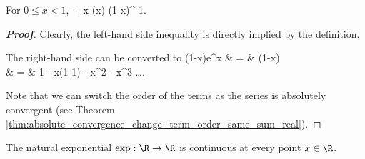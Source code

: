 \begin{proposition}\label{pro:exponential_1_plus_x_inequalities}
For $0\leq x<1$,
 + x \leq \exp(x) \leq (1-x)^{-1}.
\ee
\end{proposition}

\begin{proof}[\bf Proof]
Clearly, the left-hand side inequality is directly implied by the definition.%

The right-hand side can be converted to
\beast
(1-x)e^x & = & (1-x) \\
& = & 1 - x(1-1) - x^2 - x^3 \dots {}.
\eeast

Note that we can switch the order of the terms as the series is absolutely convergent (see Theorem \ref{thm:absolute_convergence_change_term_order_same_sum_real}).
\end{proof}







\begin{proposition}\label{pro:natural_exponential_real_continuous}
The natural exponential $\exp:\R\to \R$ is continuous at every point $x\in \R$.
\end{proposition}

